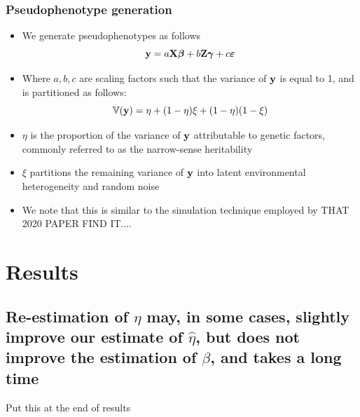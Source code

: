 \subsubsection{Pseudophenotype generation}
\begin{itemize}
    \item We generate pseudophenotypes as follows
    \begin{equation}
        \label{eqn:sim}
        \textbf{y} = a \textbf{X} \boldsymbol{\beta} + b \textbf{Z} \boldsymbol{\gamma} + c \boldsymbol{\varepsilon} \notag
    \end{equation}
    \item Where $a, b, c$ are scaling factors such that the variance of $\textbf{y}$ is equal to 1, and is partitioned as follows:
    \begin{equation}
        \label{eqn:parition_y}
        \mathbb{V}(\textbf{y}) = \eta + (1 - \eta) \xi + (1-\eta)(1-\xi) \notag
    \end{equation}
    \item $\eta$ is the proportion of the variance of $\textbf{y}$ attributable to genetic factors, commonly referred to as the narrow-sense heritability
    \item $\xi$ partitions the remaining variance of $\textbf{y}$ into latent environmental heterogeneity and random noise
    \item We note that this is similar to the simulation technique employed by THAT 2020 PAPER FIND IT....
\end{itemize}

\section{Results}

\subsection{Re-estimation of $\eta$ may, in some cases, slightly improve our estimate of $\hat{\eta}$, but does not improve the estimation of $\beta$, and takes a long time}
Put this at the end of results

\\

